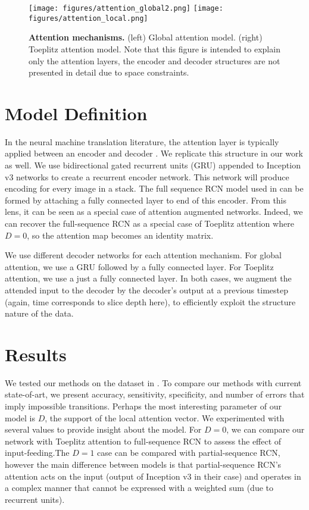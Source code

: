 \documentclass{article}
\begin{document}
\begin{figure}[ht]
    \centering
    \texttt{[image: figures/attention\_global2.png]} 
    \texttt{[image: figures/attention\_local.png]}
    \caption{\textbf{Attention mechanisms.} (left) Global attention model. (right) Toeplitz attention model. Note that this figure is intended to explain only the attention layers, the encoder and decoder structures are not presented in detail due to space constraints.}
    \label{fig:att}
\end{figure}

\section{Model Definition}
In the neural machine translation literature, the attention layer is typically applied between an encoder and decoder \cite{cho2014learning, sutskever2014sequence}. We  replicate this structure in our work as well. We  use bidirectional gated recurrent units (GRU)\cite{GRU} appended to Inception v3 networks \cite{inceptionV3} to create a recurrent encoder network. This network will produce encoding for every image in a stack. The full sequence RCN model used in \cite{bozkurt2017delineation} can be formed by attaching a fully connected layer to end of this encoder. From this lens, it can be seen as a special case of attention augmented networks. Indeed, we can recover the full-sequence RCN as a special case of Toeplitz attention where $D=0$, so the attention map becomes an identity matrix.

We use different decoder networks for each attention mechanism. For global attention, we use a GRU followed by a fully connected layer. For Toeplitz attention, we use a just a fully connected layer. In both cases, we augment the attended input to the decoder by the decoder's output at a previous timestep (again, time corresponds to slice depth here), to efficiently exploit the structure nature of the data. 

\section{Results}
We tested our methods on the dataset in \citet{bozkurt2017delineation}. To compare our methods with current state-of-art, we present accuracy, sensitivity, specificity, and number of errors that imply impossible transitions. Perhaps the most interesting parameter of our model is $D$, the support of the local attention vector. We experimented with several values to provide insight about the model. For $D=0$, we can compare our network with Toeplitz attention to full-sequence RCN to assess the effect of input-feeding.The $D=1$ case can be compared with partial-sequence RCN, however the main difference between models is that partial-sequence RCN's attention acts on the input (output of Inception v3 in their case) and operates in a complex manner that cannot be expressed with a weighted sum (due to recurrent units). 
\end{document}
